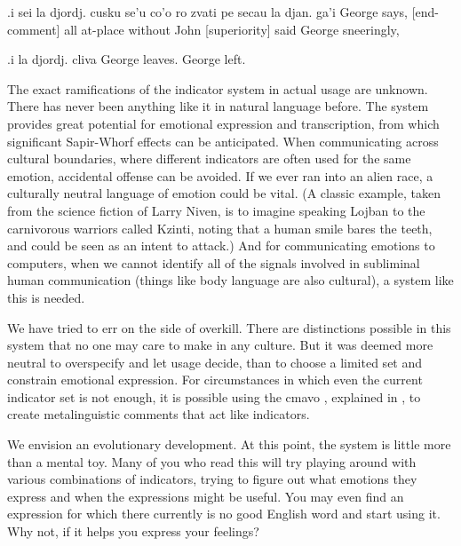 \begin{example}
.i sei la djordj. cusku se'u\n
\T	co'o ro zvati pe secau la djan. ga'i\n
{} George says, [end-comment]\n
\T	[Partings] all at-place without John [superiority]\n
{} said George sneeringly,\n
\T	{}
\end{example}

\begin{example}
.i la djordj. cliva\n
George leaves.\n
George left.
\end{example}



The exact ramifications of the indicator system in actual
    usage are unknown. There has never been anything like it in
    natural language before. The system provides great potential
    for emotional expression and transcription, from which
    significant Sapir-Whorf effects can be anticipated. When
    communicating across cultural boundaries, where different
    indicators are often used for the same emotion, accidental
    offense can be avoided. If we ever ran into an alien race, a
    culturally neutral language of emotion could be vital. (A
    classic example, taken from the science fiction of Larry Niven,
    is to imagine speaking Lojban to the carnivorous warriors
    called Kzinti, noting that a human smile bares the teeth, and
    could be seen as an intent to attack.) And for communicating
    emotions to computers, when we cannot identify all of the
    signals involved in subliminal human communication (things like
    body language are also cultural), a system like this is
    needed.

We have tried to err on the side of overkill. There are
    distinctions possible in this system that no one may care to
    make in any culture. But it was deemed more neutral to
    overspecify and let usage decide, than to choose a limited set
    and constrain emotional expression. For circumstances in which
    even the current indicator set is not enough, it is possible
    using the cmavo , explained in , to create metalinguistic
    comments that act like indicators.

We envision an evolutionary development. At this point, the
    system is little more than a mental toy. Many of you who read
    this will try playing around with various combinations of
    indicators, trying to figure out what emotions they express and
    when the expressions might be useful. You may even find an
    expression for which there currently is no good English word
    and start using it. Why not, if it helps you express your
    feelings?

